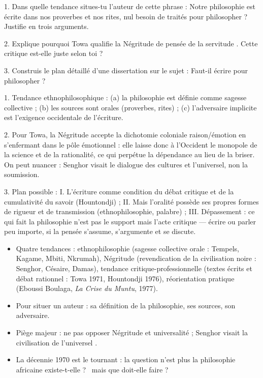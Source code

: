 \documentclass[11pt]{article}
\newcommand{\cle}[1]{{\popxbold\color{popdark}#1}}
\begin{document}
\begin{exercice}[Entraînement]
1. Dans quelle tendance situes-tu l'auteur de cette phrase : \guillemotleft Notre philosophie est écrite dans nos proverbes et nos rites, nul besoin de traités pour philosopher \guillemotright ? Justifie en trois arguments.

2. Explique pourquoi Towa qualifie la Négritude de \guillemotleft pensée de la servitude \guillemotright. Cette critique est-elle juste selon toi ?

3. Construis le plan détaillé d'une dissertation sur le sujet : \guillemotleft Faut-il écrire pour philosopher ? \guillemotright
\end{exercice}

\begin{corrige}[Exercice]
1. Tendance ethnophilosophique : (a) la philosophie est définie comme sagesse collective ; (b) les sources sont orales (proverbes, rites) ; (c) l'adversaire implicite est l'exigence occidentale de l'écriture.

2. Pour Towa, la Négritude accepte la dichotomie coloniale raison/émotion en s'enfermant dans le pôle émotionnel : elle laisse donc à l'Occident le monopole de la science et de la rationalité, ce qui perpétue la dépendance au lieu de la briser. On peut nuancer : Senghor visait le dialogue des cultures et l'universel, non la soumission.

3. Plan possible : I. L'écriture comme condition du débat critique et de la cumulativité du savoir (Hountondji) ; II. Mais l'oralité possède ses propres formes de rigueur et de transmission (ethnophilosophie, palabre) ; III. Dépassement : ce qui fait la philosophie n'est pas le support mais l'acte critique — écrire ou parler peu importe, si la pensée s'assume, s'argumente et se discute.
\end{corrige}

\begin{aretenir}
\begin{itemize}
\item Quatre tendances : \cle{ethnophilosophie} (sagesse collective orale : Tempels, Kagame, Mbiti, Nkrumah), \cle{Négritude} (revendication de la civilisation noire : Senghor, Césaire, Damas), \cle{tendance critique-professionnelle} (textes écrits et débat rationnel : Towa 1971, Hountondji 1976), \cle{réorientation pratique} (Eboussi Boulaga, \emph{La Crise du Muntu}, 1977).
\item Pour situer un auteur : sa définition de la philosophie, ses sources, son adversaire.
\item Piège majeur : ne pas opposer Négritude et universalité ; Senghor visait la \guillemotleft civilisation de l'universel \guillemotright.
\item La décennie 1970 est le tournant : la question n'est plus \guillemotleft la philosophie africaine existe-t-elle ? \guillemotright\ mais \guillemotleft que doit-elle faire ? \guillemotright
\end{itemize}
\end{aretenir}
\end{document}
